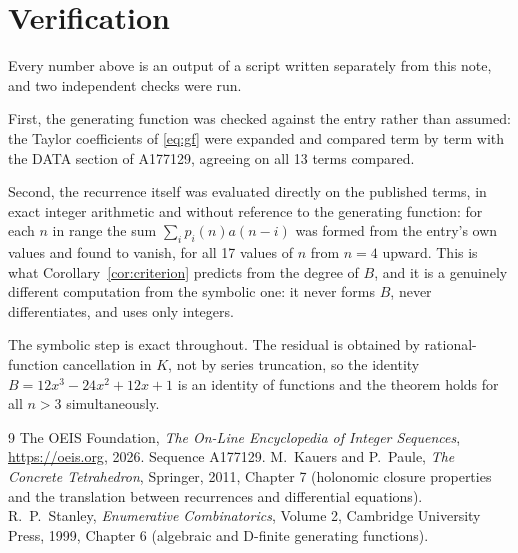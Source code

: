 \documentclass[11pt,a4paper]{article}
\theoremstyle{plain}
\theoremstyle{definition}
\begin{document}
\section{Verification}

Every number above is an output of a script written separately from this note, and two
independent checks were run.

First, the generating function was checked against the entry rather than assumed: the
Taylor coefficients of \eqref{eq:gf} were expanded and compared term by term with the DATA
section of A177129, agreeing on all 13 terms compared.

Second, the recurrence itself was evaluated directly on the published terms, in exact
integer arithmetic and without reference to the generating function: for each $n$ in range
the sum $\sum_{i}p_{i}(n)a(n-i)$ was formed from the entry's own values and found to
vanish, for all 17 values of $n$ from $n=4$ upward. This is what
Corollary~\ref{cor:criterion} predicts from the degree of $B$, and it is a genuinely
different computation from the symbolic one: it never forms $B$, never differentiates, and
uses only integers.

The symbolic step is exact throughout. The residual is obtained by rational-function
cancellation in $K$, not by series truncation, so the identity $B=12 x^{3} - 24 x^{2} + 12 x + 1$ is an
identity of functions and the theorem holds for all $n>3$ simultaneously.

\begin{thebibliography}{9}
 The OEIS Foundation, \emph{The On-Line Encyclopedia of Integer Sequences},
\url{https://oeis.org}, 2026. Sequence A177129.
 M.~Kauers and P.~Paule, \emph{The Concrete Tetrahedron}, Springer, 2011,
Chapter 7 (holonomic closure properties and the translation between recurrences and
differential equations).
 R.~P.~Stanley, \emph{Enumerative Combinatorics}, Volume 2, Cambridge
University Press, 1999, Chapter 6 (algebraic and D-finite generating functions).
\end{thebibliography}
\end{document}
